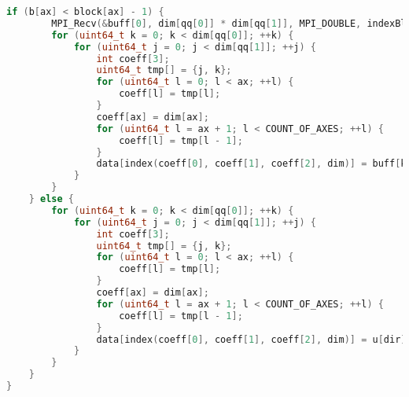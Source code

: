 \begin{lstlisting}[basicstyle=\normalfont, language=C++]
    if (b[ax] < block[ax] - 1) {
        MPI_Recv(&buff[0], dim[qq[0]] * dim[qq[1]], MPI_DOUBLE, indexBlock(b[X] + d[X], b[Y] + d[Y], b[Z] + d[Z], block), indexBlock(b[X] + d[X], b[Y] + d[Y], b[Z] + d[Z], block), MPI_COMM_WORLD, &status);
        for (uint64_t k = 0; k < dim[qq[0]]; ++k) {
            for (uint64_t j = 0; j < dim[qq[1]]; ++j) {
                int coeff[3];
                uint64_t tmp[] = {j, k};
                for (uint64_t l = 0; l < ax; ++l) {
                    coeff[l] = tmp[l];
                }
                coeff[ax] = dim[ax];
                for (uint64_t l = ax + 1; l < COUNT_OF_AXES; ++l) {
                    coeff[l] = tmp[l - 1];
                }
                data[index(coeff[0], coeff[1], coeff[2], dim)] = buff[k * dim[qq[1]] + j];
            }
        }
    } else {
        for (uint64_t k = 0; k < dim[qq[0]]; ++k) {
            for (uint64_t j = 0; j < dim[qq[1]]; ++j) {
                int coeff[3];
                uint64_t tmp[] = {j, k};
                for (uint64_t l = 0; l < ax; ++l) {
                    coeff[l] = tmp[l];
                }
                coeff[ax] = dim[ax];
                for (uint64_t l = ax + 1; l < COUNT_OF_AXES; ++l) {
                    coeff[l] = tmp[l - 1];
                }
                data[index(coeff[0], coeff[1], coeff[2], dim)] = u[dir];
            }
        }
    }
}
\end{lstlisting}

\vspace{15pt}

